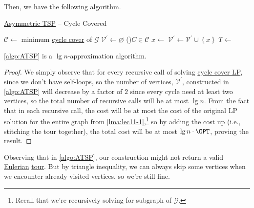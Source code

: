 Then, we have the following algorithm.

\begin{algorithm}[H]\label{algo:ATSP}
	\DontPrintSemicolon{}
	\caption{\hyperref[prb:ATSP]{Asymmetric TSP} -- Cycle Covered}
	\BlankLine
	\(\mathcal{C}\gets\) minimum \hyperref[subsec:cycle-covering-LP]{cycle cover} of \(\mathcal{G}\)\;
	\(\mathcal{V} ^\prime \gets \varnothing \)\;
	\For(){\(C\in \mathcal{C} \)}{
		\(x\gets\)
		\(\mathcal{V} ^\prime \gets \mathcal{V} ^\prime \cup \left\{ x \right\}\)\;
	}
	\(T\gets\)
	\;
	\;
\end{algorithm}

\begin{theorem}
	\autoref{algo:ATSP} is a \(\lg n\)-approximation algorithm.
\end{theorem}
\begin{proof}
	We simply observe that for every recursive call of solving \hyperref[subsec:cycle-covering-LP]{cycle cover LP}, since we don't have self-loops, so the number of vertices, \(\mathcal{V} ^\prime \), constructed in \autoref{algo:ATSP} will decrease by a factor of \(2\) since every cycle need at least two vertices, so the total number of recursive calls will be at most \(\lg n\). From the fact that in each recursive call, the cost will be at most the cost of the original LP solution for the entire graph from \autoref{lma:lec11-1},\footnote{Recall that we're recursively solving for subgraph of \(\mathcal{G} \).} so by adding the cost up (i.e., stitching the tour together), the total cost will be at most \(\lg n\cdot \OPT\), proving the result.
\end{proof}

\begin{remark}[Repetition]
	Observing that in \autoref{algo:ATSP}, our construction might not return a valid  \href{https://en.wikipedia.org/wiki/Eulerian_path}{Eulerian} \hyperref[def:tour]{tour}. But by triangle inequality, we can always skip some vertices when we encounter already visited vertices, so we're still fine.
\end{remark}

